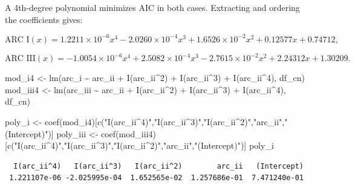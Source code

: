 \documentclass[
  letterpaper,
  DIV=11,
  numbers=noendperiod]{scrartcl}
\newenvironment{Shaded}{\begin{snugshade}}{\end{snugshade}}
\newcommand{\DecValTok}[1]{\textcolor[rgb]{0.68,0.00,0.00}{#1}}
\newcommand{\FunctionTok}[1]{\textcolor[rgb]{0.28,0.35,0.67}{#1}}
\newcommand{\NormalTok}[1]{\textcolor[rgb]{0.00,0.23,0.31}{#1}}
\newcommand{\OtherTok}[1]{\textcolor[rgb]{0.00,0.23,0.31}{#1}}
\newcommand{\SpecialCharTok}[1]{\textcolor[rgb]{0.37,0.37,0.37}{#1}}
\newcommand{\StringTok}[1]{\textcolor[rgb]{0.13,0.47,0.30}{#1}}
\begin{document}
A 4th-degree polynomial minimizes AIC in both cases. Extracting and
ordering the coefficients gives:

\[
\text{ARC I}(x) = 1.2211 \times 10^{-6} x^4 - 2.0260 \times 10^{-4} x^3 + 1.6526 \times 10^{-2} x^2 + 0.12577 x + 0.74712,
\]

\[
\text{ARC III}(x) = -1.0054 \times 10^{-6} x^4 + 2.5082 \times 10^{-4} x^3 - 2.7615 \times 10^{-2} x^2 + 2.24312 x + 1.30209.
\]

\begin{Shaded}
\begin{Highlighting}[]
\NormalTok{mod\_i4   }\OtherTok{\textless{}{-}} \FunctionTok{lm}\NormalTok{(arc\_i   }\SpecialCharTok{\textasciitilde{}}\NormalTok{ arc\_ii }\SpecialCharTok{+} \FunctionTok{I}\NormalTok{(arc\_ii}\SpecialCharTok{\^{}}\DecValTok{2}\NormalTok{) }\SpecialCharTok{+} \FunctionTok{I}\NormalTok{(arc\_ii}\SpecialCharTok{\^{}}\DecValTok{3}\NormalTok{) }\SpecialCharTok{+} \FunctionTok{I}\NormalTok{(arc\_ii}\SpecialCharTok{\^{}}\DecValTok{4}\NormalTok{), df\_cn)}
\NormalTok{mod\_iii4 }\OtherTok{\textless{}{-}} \FunctionTok{lm}\NormalTok{(arc\_iii }\SpecialCharTok{\textasciitilde{}}\NormalTok{ arc\_ii }\SpecialCharTok{+} \FunctionTok{I}\NormalTok{(arc\_ii}\SpecialCharTok{\^{}}\DecValTok{2}\NormalTok{) }\SpecialCharTok{+} \FunctionTok{I}\NormalTok{(arc\_ii}\SpecialCharTok{\^{}}\DecValTok{3}\NormalTok{) }\SpecialCharTok{+} \FunctionTok{I}\NormalTok{(arc\_ii}\SpecialCharTok{\^{}}\DecValTok{4}\NormalTok{), df\_cn)}

\NormalTok{poly\_i   }\OtherTok{\textless{}{-}} \FunctionTok{coef}\NormalTok{(mod\_i4)[}\FunctionTok{c}\NormalTok{(}\StringTok{"I(arc\_ii\^{}4)"}\NormalTok{,}\StringTok{"I(arc\_ii\^{}3)"}\NormalTok{,}\StringTok{"I(arc\_ii\^{}2)"}\NormalTok{,}\StringTok{"arc\_ii"}\NormalTok{,}\StringTok{"(Intercept)"}\NormalTok{)]}
\NormalTok{poly\_iii }\OtherTok{\textless{}{-}} \FunctionTok{coef}\NormalTok{(mod\_iii4)[}\FunctionTok{c}\NormalTok{(}\StringTok{"I(arc\_ii\^{}4)"}\NormalTok{,}\StringTok{"I(arc\_ii\^{}3)"}\NormalTok{,}\StringTok{"I(arc\_ii\^{}2)"}\NormalTok{,}\StringTok{"arc\_ii"}\NormalTok{,}\StringTok{"(Intercept)"}\NormalTok{)]}
\NormalTok{poly\_i}
\end{Highlighting}
\end{Shaded}

\begin{verbatim}
  I(arc_ii^4)   I(arc_ii^3)   I(arc_ii^2)        arc_ii   (Intercept) 
 1.221107e-06 -2.025995e-04  1.652565e-02  1.257686e-01  7.471240e-01 
\end{verbatim}
\end{document}
